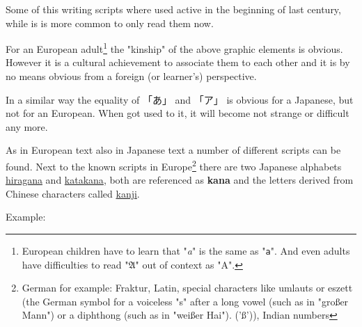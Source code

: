 Some of this writing scripts where used active in the beginning of last
century, while is is more common to only read them now.

For an European adult\footnote{European children have to learn that
"\textit{a}" is the same as "\texttt{a}". And even adults have difficulties to
read "$\mathfrak{A}$" out of context as "A".}  the "kinship" of the above
graphic elements is obvious. However it is a cultural achievement to associate
them to each other and it is by no means obvious from a foreign (or learner's)
perspective.

In a similar way the equality of {「あ」} and {「ア」} is obvious for a
Japanese, but not for an European. When got used to it, it will become not
strange or difficult any more.

As in European text also in Japanese text a number of different scripts can be
found. Next to the known scripts in Europe\footnote{German for example:
Fraktur, Latin, special characters like umlauts or eszett (the German
symbol for a voiceless "s" after a long vowel (such as in "großer Mann") or a
diphthong (such as in "weißer Hai"). ('ß')), Indian numbers} there are two
Japanese alphabets
\hyperref[sec:Hiragana]{hiragana} and \hyperref[sec:Katakana]{katakana}, both
are referenced as \textbf{kana} and the letters derived from Chinese characters
called \hyperref[sec:Kanji]{kanji}.

Example:

